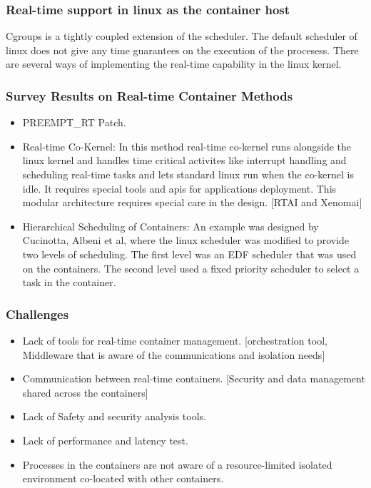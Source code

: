 \documentclass{beamer}
\begin{document}
\begin{frame}
    \frametitle{Real-time support in linux as the container host}
    Cgroups is a tightly coupled extension of the scheduler. The default
    scheduler of linux does not give any time guarantees on the execution of the
    procesess. There are several ways of implementing the real-time capability
    in the linux kernel.
\end{frame}

\begin{frame}
    \frametitle{Survey Results on Real-time Container Methods}
    \begin{itemize}
        \item PREEMPT\_RT Patch.
        \item Real-time Co-Kernel: In this method real-time co-kernel runs
            alongside the linux kernel and handles time critical activites
            like interrupt handling and scheduling real-time tasks and lets
            standard linux run when the co-kernel is idle. It requires special
            tools and apis for applications deployment. This modular architecture
            requires special care in the design. [RTAI and Xenomai]
        \item Hierarchical Scheduling of Containers: An example was designed by
            Cucinotta, Albeni et al, where the linux scheduler was modified
            to provide two levels of scheduling. The first level was an EDF
            scheduler that was used on the containers. The second level used a
            fixed priority scheduler to select a task in the container.
    \end{itemize}
\end{frame}

\begin{frame}
    \frametitle{Challenges}
    \begin{itemize}
        \item Lack of tools for real-time container management.
            [orchestration tool, Middleware that is aware of
            the communications and isolation needs]
        \item Communication between real-time containers.
            [Security and data management shared across the containers]
        \item Lack of Safety and security analysis tools.
        \item Lack of performance and latency test.
        \item Processes in the containers are not aware of a resource-limited
            isolated environment co-located with other containers.
    \end{itemize}
\end{frame}
\end{document}
